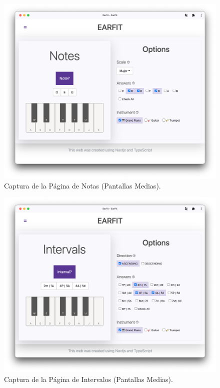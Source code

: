 \documentclass[12pt,twoside,titlepage]{report}
\begin{document}
\begin{figure}[H]
    \centering
    \includegraphics[scale=0.3]{Capturas Earfit/Tablet/Notes}
    \caption{Captura de la Página de Notas (Pantallas Medias).}
    \label{fig:TabletNotes}
\end{figure}

\begin{figure}[H]
    \centering
    \includegraphics[scale=0.3]{Capturas Earfit/Tablet/Intervals}
    \caption{Captura de la Página de Intervalos (Pantallas Medias).}
    \label{fig:TabletIntervals}
\end{figure}
\end{document}
